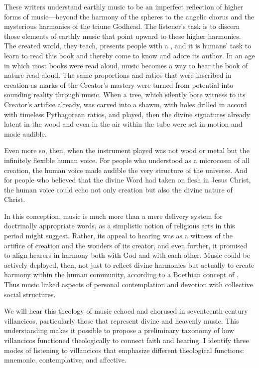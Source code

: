 \documentclass[tt]{vcbook-proposal}
\begin{document}
These writers understand earthly music to be an imperfect reflection of higher forms of music---beyond the harmony of the spheres to the angelic chorus and the mysterious harmonies of the triune Godhead. 
The listener's task is to discern those elements of earthly music that point upward to these higher harmonies.
The created world, they teach, presents people with a , and it is humans' task to learn to read this book and thereby come to know and adore its author.
In an age in which most books were read aloud, music becomes a way to hear the book of nature read aloud.
The same proportions and ratios that were inscribed in creation as marks of the Creator's mastery were turned from potential into sounding reality through music. 
When a tree, which silently bore witness to its Creator's artifice already, was carved into a shawm, with holes drilled in accord with timeless Pythagorean ratios, and played, then the divine signatures already latent in the wood and even in the air within the tube were set in motion and made audible.

Even more so, then, when the instrument played was not wood or metal but the infinitely flexible human voice.
For people who understood  as a microcosm of all creation, the human voice made audible the very structure of the universe.
And for people who believed that the divine Word had taken on flesh in Jesus Christ, the human voice could echo not only creation but also the divine nature of Christ.

In this conception, music is much more than a mere delivery system for doctrinally appropriate words, as a simplistic notion of religious arts in this period might suggest.
Rather, its appeal to hearing was as a witness of the artifice of creation and the wonders of its creator, and even further, it promised to align hearers in harmony both with God and with each other.
Music could be actively deployed, then, not just to reflect divine harmonies but actually to create harmony within the human community, according to a Boethian concept of .
Thus music linked aspects of personal contemplation and devotion with collective social structures.

We will hear this theology of music echoed and chorused in seventeenth-century villancicos, particularly those that represent divine and heavenly music.
This understanding makes it possible to propose a preliminary taxonomy of how villancicos functioned theologically to connect faith and hearing. 
I identify three modes of listening to villancicos that emphasize different theological functions: mnemonic, contemplative, and affective.
\end{document}
